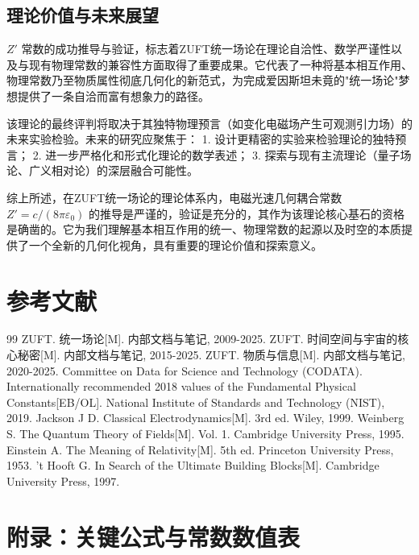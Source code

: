 \documentclass[a4paper,12pt]{article}
\theoremstyle{plain}
\begin{document}
\subsection{理论价值与未来展望}
$Z'$ 常数的成功推导与验证，标志着ZUFT统一场论在理论自洽性、数学严谨性以及与现有物理常数的兼容性方面取得了重要成果。它代表了一种将基本相互作用、物理常数乃至物质属性彻底几何化的新范式，为完成爱因斯坦未竟的"统一场论"梦想提供了一条自洽而富有想象力的路径。

该理论的最终评判将取决于其独特物理预言（如变化电磁场产生可观测引力场）的未来实验检验。未来的研究应聚焦于：
1. 设计更精密的实验来检验理论的独特预言；
2. 进一步严格化和形式化理论的数学表述；
3. 探索与现有主流理论（量子场论、广义相对论）的深层融合可能性。

综上所述，在ZUFT统一场论的理论体系内，电磁光速几何耦合常数 $Z' = c/(8\pi\varepsilon_0)$ 的推导是严谨的，验证是充分的，其作为该理论核心基石的资格是确凿的。它为我们理解基本相互作用的统一、物理常数的起源以及时空的本质提供了一个全新的几何化视角，具有重要的理论价值和探索意义。

\section{参考文献}

\begin{thebibliography}{99}
 ZUFT. 统一场论[M]. 内部文档与笔记, 2009-2025.
 ZUFT. 时间空间与宇宙的核心秘密[M]. 内部文档与笔记, 2015-2025.
 ZUFT. 物质与信息[M]. 内部文档与笔记, 2020-2025.
 Committee on Data for Science and Technology (CODATA). Internationally recommended 2018 values of the Fundamental Physical Constants[EB/OL]. National Institute of Standards and Technology (NIST), 2019.
 Jackson J D. Classical Electrodynamics[M]. 3rd ed. Wiley, 1999.
 Weinberg S. The Quantum Theory of Fields[M]. Vol. 1. Cambridge University Press, 1995.
 Einstein A. The Meaning of Relativity[M]. 5th ed. Princeton University Press, 1953.
 't Hooft G. In Search of the Ultimate Building Blocks[M]. Cambridge University Press, 1997.
\end{thebibliography}

\section{附录：关键公式与常数数值表}
\end{document}

